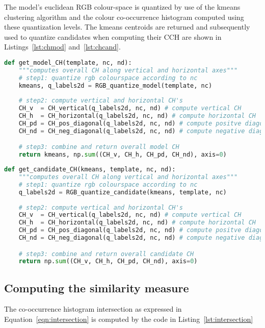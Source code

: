 The model's euclidean RGB colour-space is quantized by use of the kmeans
clustering algorithm and the colour co-occurrence histogram computed using these
quantization levels. The kmeans centroids are returned and subsequently used to
quantize candidates when computing their CCH are shown in
Listings~\ref{lst:chmod} and~\ref{lst:chcand}.

\begin{lstlisting}[language=Python, caption={Computing model CH}, captionpos=b, label={lst:chmod}]
def get_model_CH(template, nc, nd):
    """computes overall CH along vertical and horizontal axes"""
    # step1: quantize rgb colourspace according to nc
    kmeans, q_labels2d = RGB_quantize_model(template, nc)
    
    # step2: compute vertical and horizontal CH's
    CH_v  = CH_vertical(q_labels2d, nc, nd) # compute vertical CH
    CH_h  = CH_horizontal(q_labels2d, nc, nd) # compute horizontal CH
    CH_pd = CH_pos_diagonal(q_labels2d, nc, nd) # compute positve diagonal CH
    CH_nd = CH_neg_diagonal(q_labels2d, nc, nd) # compute negative diagonal CH

    # step3: combine and return overall model CH
    return kmeans, np.sum((CH_v, CH_h, CH_pd, CH_nd), axis=0)
\end{lstlisting}

\begin{lstlisting}[language=Python, caption={Computing candidate CH}, captionpos=b, label={lst:chcand}]
def get_candidate_CH(kmeans, template, nc, nd):
    """computes overall CH along vertical and horizontal axes"""
    # step1: quantize rgb colourspace according to nc
    q_labels2d = RGB_quantize_candidate(kmeans, template, nc)
    
    # step2: compute vertical and horizontal CH's
    CH_v  = CH_vertical(q_labels2d, nc, nd) # compute vertical CH
    CH_h  = CH_horizontal(q_labels2d, nc, nd) # compute horizontal CH
    CH_pd = CH_pos_diagonal(q_labels2d, nc, nd) # compute positve diagonal CH
    CH_nd = CH_neg_diagonal(q_labels2d, nc, nd) # compute negative diagonal CH

    # step3: combine and return overall candidate CH
    return np.sum((CH_v, CH_h, CH_pd, CH_nd), axis=0)
\end{lstlisting}

\subsection{Computing the similarity measure}
The co-occurrence histogram intersection as expressed in
Equation~\ref{eqn:intersection} is computed by the code in
Listing~\ref{lst:intersection}

